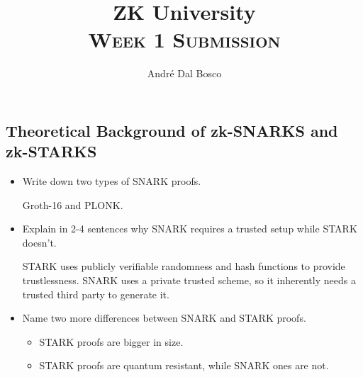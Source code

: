 \documentclass{article}
\title{ZK University \\[4pt] \normalsize\textsc{Week 1 Submission}}
\author{André Dal Bosco \\ \small{\email \quad \discord}}
\begin{document}
\maketitle

\subsection*{Theoretical Background of zk-SNARKS and zk-STARKS}
\begin{itemize}
    \item Write down two types of SNARK proofs. \par Groth-16 and PLONK.
    \item Explain in 2-4 sentences why SNARK requires a trusted setup while STARK doesn’t. \par STARK uses publicly verifiable randomness and hash functions to provide trustlessness. SNARK uses a private trusted scheme, so it inherently needs a trusted third party to generate it.
    \item Name two more differences between SNARK and STARK proofs.
    \begin{itemize}
        \item STARK proofs are bigger in size.
        \item STARK proofs are quantum resistant, while SNARK ones are not.
    \end{itemize}
\end{itemize}
\end{document}
